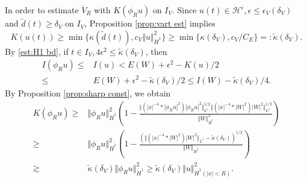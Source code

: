 \documentclass[reqno, 11pt]{amsart}
\numberwithin{equation}{section}
\theoremstyle{plain}
\theoremstyle{definition}
\numberwithin{equation}{section}
\numberwithin{theorem}{section}
\numberwithin{equation}{section}
\numberwithin{equation}{section}
\numberwithin{theorem}{section}
\begin{document}
	In order to estimate $\ddot{V}_R$ with $K\left(\phi_{R}u\right)$ on $I_V$. Since $u(t)\in \mathcal{H}^{\epsilon}, \epsilon \leq \epsilon_{V}(\delta_{V})$ and $\widetilde{d}(t) \geq \delta_{V}$ on $I_V$, Proposition \ref{prop:vart est} implies
	\begin{equation*}
	K(u(t))\geq \min\{\kappa(\widetilde{d}(t)), c_{V}\Vert u\Vert_{\dot H^1}^2 \}\geq \min\{\kappa(\delta_{V}), c_{V}/C_E \}=:\widetilde{\kappa}(\delta_{V}).
	\end{equation*}
	By \eqref{est:H1 bd}, if $t\in I_V, 4\epsilon^2 \leq \widetilde{\kappa}(\delta_{V})$, then 
	\begin{equation*}
	\begin{aligned}
	I\left(\phi_{R}u\right) \leq& I(u)<E(W)+\epsilon^2-K(u)/2\\  \leq& E(W)+\epsilon^2-\widetilde{\kappa}(\delta_{V})/2 \leq I(W)-\widetilde{\kappa}(\delta_{V})/4.
	\end{aligned}
	\end{equation*} 
	By Proposition \ref{prop:sharp const}, we obtain
	\begin{equation}\label{est:IV Kcutf}
	\begin{aligned}
	K(\phi_{R}u)\geq& \Vert \phi_{R}u \Vert_{\dot H^1}^2 \left( 1-\frac{ \Vert \left(|x|^{-4}*|\phi_{R}u|^2 \right)|\phi_{R}u|^2 \Vert_{L^1}^{1/2} \Vert \left(|x|^{-4}*|W|^2 \right)|W|^2 \Vert_{L^1}^{1/2}  } {\Vert W \Vert_{\dot H^1}^2}  \right)\\ \geq& \Vert \phi_{R}u \Vert_{\dot H^1}^2\left(1-\frac{\left( \Vert \left(|x|^{-4}*|W|^2 \right)|W|^2 \Vert_{L^1}-\widetilde{\kappa}(\delta_{V}) \right)^{1/2}}{\Vert W \Vert_{\dot H^1}}  \right)\\\gtrsim& \widetilde{\kappa}(\delta_{V}) \Vert \phi_{R}u \Vert_{\dot H^1}^2
	\geq \widetilde{\kappa}(\delta_{V}) \Vert u \Vert_{\dot H^1(|x|<R
		)}^2.
	\end{aligned}
	\end{equation}
	
\end{document}
